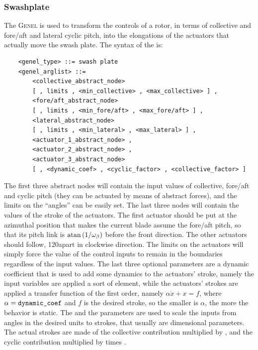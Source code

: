 \subsubsection{Swashplate}
The  \textsc{Genel} is used to transform the controls 
of a rotor, in terms of collective and fore/aft and lateral cyclic pitch, 
into the elongations of the actuators that actually move the swash plate.
The syntax of the  is:
\begin{verbatim}
    <genel_type> ::= swash plate
    <genel_arglist> ::=
        <collective_abstract_node> 
        [ , limits , <min_collective> , <max_collective> ] ,
        <fore/aft_abstract_node> 
        [ , limits , <min_fore/aft> , <max_fore/aft> ] ,
        <lateral_abstract_node> 
        [ , limits , <min_lateral> , <max_lateral> ] ,
        <actuator_1_abstract_node> ,
        <actuator_2_abstract_node> ,
        <actuator_3_abstract_node> 
        [ , <dynamic_coef> , <cyclic_factor> , <collective_factor> ]
\end{verbatim}
The first three abstract nodes will contain the input values 
of collective, fore/aft and cyclic pitch
(they can be actuated by means of abstract forces),
and the limits on the ``angles'' can be easily set. 
The last three nodes will contain the values of the stroke of the actuators.
The first actuator should be put at the azimuthal position 
that makes the current blade assume the fore/aft pitch,
so that its pitch link is $\mathrm{atan}\left( 1/\omega_{\beta} \right)$
before the front direction.
The other actuators should follow, 120\degr apart in clockwise direction.
The limits on the actuators will simply force the value of the control
inputs to remain in the boundaries regardless of the input values.
The last three optional parameters are a dynamic coefficient that is used to
add some dynamics to the actuators' stroke, namely the input variables are
applied a sort of   element, while the
actuators' strokes are applied a transfer function of the first order, namely
$ \alpha\dot{x}+x=f $, where $ \alpha=\texttt{dynamic\_coef} $ and $ f $ is
the desired stroke, so the smaller is $ \alpha $, the more the behavior is
static.
The  and the  parameters are
used to scale the inputs from angles in the desired units to strokes, that
usually are dimensional parameters. The actual strokes are made of the
collective contribution multiplied by , and the
cyclic contribution multiplied by  times 
.


